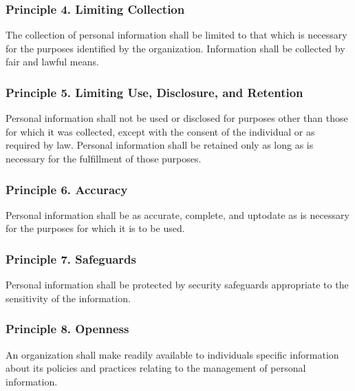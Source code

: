 \documentclass[letterpaper,10pt,english]{sphinxmanual}
\begin{document}
\subsubsection{Principle 4. Limiting Collection}
\label{\detokenize{2_compliance:principle-4-limiting-collection}}
\sphinxAtStartPar
The collection of personal information shall be limited to that which is necessary for the
purposes identified by the organization. Information shall be collected by fair and lawful
means.


\subsubsection{Principle 5. Limiting Use, Disclosure, and Retention}
\label{\detokenize{2_compliance:principle-5-limiting-use-disclosure-and-retention}}
\sphinxAtStartPar
Personal information shall not be used or disclosed for purposes other than those for which it
was collected, except with the consent of the individual or as required by law. Personal
information shall be retained only as long as is necessary for the fulfillment of those
purposes.


\subsubsection{Principle 6. Accuracy}
\label{\detokenize{2_compliance:principle-6-accuracy}}
\sphinxAtStartPar
Personal information shall be as accurate, complete, and up\sphinxhyphen{}to\sphinxhyphen{}date as is necessary for the
purposes for which it is to be used.


\subsubsection{Principle 7. Safeguards}
\label{\detokenize{2_compliance:principle-7-safeguards}}
\sphinxAtStartPar
Personal information shall be protected by security safeguards appropriate to the sensitivity
of the information.


\subsubsection{Principle 8. Openness}
\label{\detokenize{2_compliance:principle-8-openness}}
\sphinxAtStartPar
An organization shall make readily available to individuals specific information about its
policies and practices relating to the management of personal information.
\end{document}
